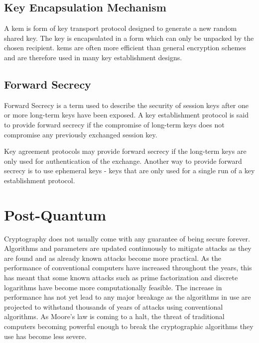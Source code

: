\subsection{Key Encapsulation Mechanism}

A \gls{kem} is form of key transport protocol designed to generate a new random shared key. The key is encapsulated in a form which can only be unpacked by the chosen recipient. \glspl{kem} are often more efficient than general encryption schemes and are therefore used in many key establishment designs\cite{boyd2020:key-encapsulation}.


\subsection{Forward Secrecy}

Forward Secrecy is a term used to describe the security of session keys after one or more long-term keys have been exposed. A key establishment protocol is said to provide forward secrecy if the compromise of long-term keys does not compromise any previously exchanged session key\cite{boyd2020:forward-secrecy}.

Key agreement protocols may provide forward secrecy if the long-term keys are only used for authentication of the exchange. Another way to provide forward secrecy is to use ephemeral keys - keys that are only used for a single run of a key establishment protocol\cite{boyd2020:forward-secrecy}.

\section{Post-Quantum}

Cryptography does not usually come with any guarantee of being secure forever. Algorithms and parameters are updated continuously to mitigate attacks as they are found and as already known attacks become more practical\cite{nist2019}. As the performance of conventional computers have increased throughout the years, this has meant that some known attacks such as prime factorization and discrete logarithms have become more computationally feasible. The increase in performance has not yet lead to any major breakage as the algorithms in use are projected to withstand thousands of years of attacks using conventional algorithms\cite{thome2019}. As Moore's law is coming to a halt\cite{theis2017}, the threat of traditional computers becoming powerful enough to break the cryptographic algorithms they use has become less severe.

